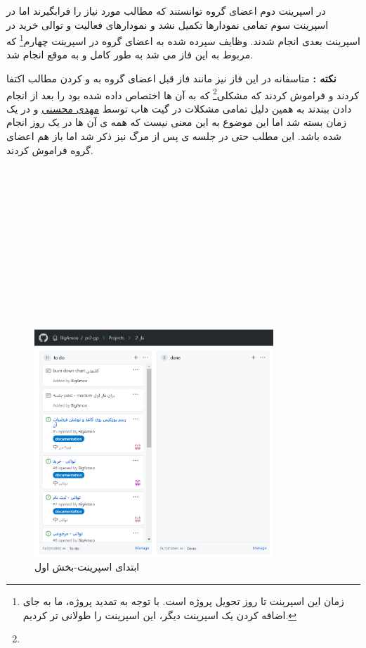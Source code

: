 \documentclass[12pt,a4paper]{article}
\begin{document}
در اسپرینت دوم اعضای گروه توانستند که مطالب مورد نیاز را فرابگیرند اما در اسپرینت سوم تمامی نمودارها تکمیل نشد و نمودارهای فعالیت و توالی خرید در اسپرینت بعدی انجام شدند. وظایف سپرده شده به اعضای گروه در اسپرینت چهارم\footnote{زمان این اسپرینت تا روز تحویل پروژه است. با توجه به تمدید پروژه، ما به جای اضافه کردن یک اسپرینت دیگر، این اسپرینت را طولانی تر کردیم.} که مربوط به این فاز می شد به طور کامل و به موقع انجام شد. 


\textbf{نکته :} متاسفانه در این فاز نیز مانند فاز قبل اعضای گروه به  و  کردن مطالب اکتفا کردند و فراموش کردند که مشکلی\footnote{} که به آن ها اختصاص داده شده بود را بعد از انجام دادن ببندند به همین دلیل تمامی مشکلات در گیت هاب توسط \underline{مهدی محسنی} و در یک زمان بسته شد اما این موضوع به این معنی نیست که همه ی آن ها در یک روز انجام شده باشد. این مطلب حتی در جلسه ی پس از مرگ نیز ذکر شد اما باز هم اعضای گروه فراموش کردند.
\\
\\
\\
\\
\\
\\
\\
\\
\\
\\
\\
\\

\pagebreak
	\subsection{} \label{section.report.taskBoard}
			\begin{figure}[h!]
			\begin{center}
				\includegraphics[width=9cm]{images/screenshot_1.png}	
			\end{center}
			\caption{ابتدای اسپرینت-بخش اول}
		\end{figure}
		
\end{document}
